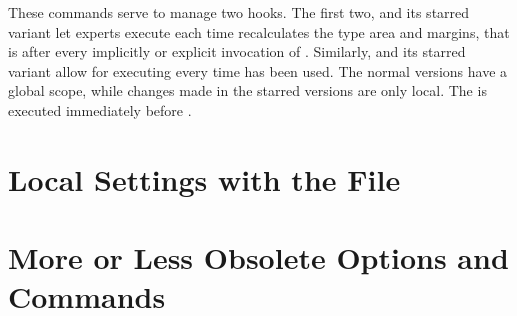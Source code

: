 \begin{Declaration}
\end{Declaration}%
These commands serve to manage two hooks. The first two,
 and its starred variant let experts execute
 each time  recalculates the type area and
margins, that is after every implicitly or explicit invocation of
. Similarly,
 and its starred
variant allow for executing  every time
 has been used. The normal versions have a
global scope, while changes made in the starred versions are only local. The
 is executed immediately before .%
% 
\EndIndexGroup


\section{Local Settings with the  File}
\BeginIndexGroup
{}

%
\EndIndexGroup

\section{More or Less Obsolete Options and Commands}
%
\EndIndexGroup

\endinput

